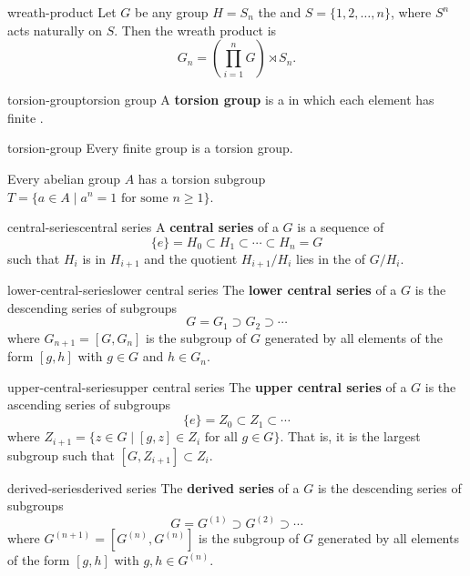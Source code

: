 \begin{example}{wreath-product}
    Let $G$ be any group $H = S_n$ the  and $S = \{ 1, 2, \ldots, n \}$, where $S^n$ acts naturally on $S$. Then the wreath product is
    \[ G_n = \left( \prod_{i = 1}^{n} G \right) \rtimes S_n . \]
\end{example}

\begin{topic}{torsion-group}{torsion group}
    A \textbf{torsion group} is a  in which each element has finite .
\end{topic}

\begin{example}{torsion-group}
    Every finite group is a torsion group.
    
    Every abelian group $A$ has a torsion subgroup $T = \{ a \in A \mid a^n = 1 \text{ for some } n \ge 1 \}$.
\end{example}

\begin{topic}{central-series}{central series}
    A \textbf{central series} of a  $G$ is a sequence of 
    \[ \{ e \} = H_0 \subset H_1 \subset \cdots \subset H_n = G \]
    such that $H_i$ is  in $H_{i + 1}$ and the quotient $H_{i + 1}/H_i$ lies in the  of $G/H_i$.
\end{topic}

\begin{topic}{lower-central-series}{lower central series}
    The \textbf{lower central series} of a  $G$ is the descending series of subgroups
    \[ G = G_1 \supset G_2 \supset \cdots \]
    where $G_{n + 1} = [G, G_n]$ is the subgroup of $G$ generated by all elements of the form $[g, h]$ with $g \in G$ and $h \in G_n$.
\end{topic}

\begin{topic}{upper-central-series}{upper central series}
    The \textbf{upper central series} of a  $G$ is the ascending series of subgroups
    \[ \{ e \} = Z_0 \subset Z_1 \subset \cdots \]
    where $Z_{i + 1} = \{ z \in G \mid [g, z] \in Z_i \text{ for all } g \in G \}$. That is, it is the largest subgroup such that $[G, Z_{i + 1}] \subset Z_i$.
\end{topic}

\begin{topic}{derived-series}{derived series}
    The \textbf{derived series} of a  $G$ is the descending series of subgroups
    \[ G = G^{(1)} \supset G^{(2)} \supset \cdots \]
    where $G^{(n + 1)} = [G^{(n)}, G^{(n)}]$ is the subgroup of $G$ generated by all elements of the form $[g, h]$ with $g, h \in G^{(n)}$.
\end{topic}

